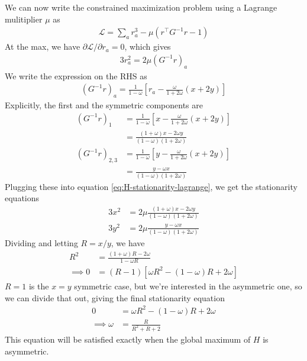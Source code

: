 \documentclass[11pt, reqno]{amsart}
\theoremstyle{notestyle}
\theoremstyle{defstyle}
\begin{document}
We can now write the constrained maximization problem using a Lagrange mulitiplier $\mu$ as
\begin{align*}
    \mathcal{L} = \sum_a r_a^3 - \mu (r^\top G^{-1} r - 1)
\end{align*}
At the max, we have $\partial \mathcal{L} / \partial r_a = 0$, which gives
\begin{align}\label{eq:H-stationarity-lagrange}
    3r_a^2 = 2\mu (G^{-1} r)_a
\end{align}
We write the expression on the RHS as
\begin{align*}
    (G^{-1} r)_a
    = \frac{1}{1-\omega} \left[ r_a - \frac{\omega}{1 + 2\omega} (x + 2y) \right]
\end{align*}
Explicitly, the first and the symmetric components are
\begin{align*}
    (G^{-1} r)_1
    &= \frac{1}{1-\omega} \left[ x - \frac{\omega}{1 + 2\omega} (x + 2y) \right] \\
    &= \frac{(1 + \omega)x - 2\omega y}{(1-\omega)(1 + 2\omega)} \\
    (G^{-1}r)_{2,3}
    &= \frac{1}{1-\omega} \left[ y - \frac{\omega}{1 + 2\omega} (x + 2y) \right] \\
    &= \frac{y - \omega x}{(1-\omega)(1+2\omega)}
\end{align*}
Plugging these into equation \ref{eq:H-stationarity-lagrange}, we get the stationarity equations
\begin{align*}
    3x^2
    &= 2\mu \frac{(1 + \omega)x - 2\omega y}{(1-\omega)(1 + 2\omega)} \\
    3y^2
    &= 2 \mu \frac{y - \omega x}{(1-\omega)(1+2\omega)}
\end{align*}
Dividing and letting $R = x/y$, we have
\begin{align*}
    R^2
    &= \frac{(1+\omega)R - 2\omega}{1 - \omega R} \\
    \implies
    0 &= (R - 1) \left[\omega R^2 - (1 - \omega)R + 2\omega \right]
\end{align*}
$R=1$ is the $x = y$ symmetric case, but we're interested in the asymmetric one, so we can divide that out, giving the final stationarity equation
\begin{align}\label{eq:stationarity}
    0 &= \omega R^2 - (1-\omega)R + 2\omega \\
    \implies
    \omega &= \frac{R}{R^2 + R + 2}
\end{align}
This equation will be satisfied exactly when the global maximum of $H$ is asymmetric.
\end{document}
